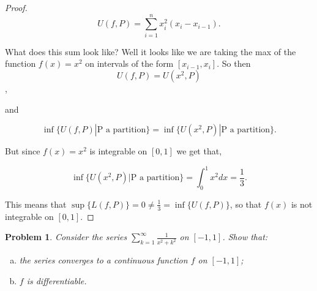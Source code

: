 \documentclass[11pt]{article}
\theoremstyle{plain}
\newtheorem{problem}{Problem}
\theoremstyle{remark}
\begin{document}
\begin{proof}
	\[
	U(f,P) =\sum_{i=1}^n x^2_i(x_i-x_{i-1}).
	\]
	
	What does this sum look like? Well it looks like we are taking the max of the function $f(x)=x^2$ on intervals of the form $[x_{i-1},x_i]$. So then \[U(f,P)=U(x^2,P)\],
	
	and 
	
	\[\inf\{U(f,P)|\text{P a partition}\}=\inf \{U(x^2,P)|\text{P a partition}\}.\] 
	
	But since $f(x)=x^2$ is integrable on $[0,1]$ we get that,
	
	\[\inf \{U(x^2,P)|\text{P a partition}\}=\int_0^1 x^2 dx=\frac 1 3.\]
	
	This means that $\sup\{L(f,P)\}=0\neq \frac 1 3 =  \inf\{U(f,P)\}$, so that $f(x)$ is not integrable on $[0,1]$.
\end{proof}

\begin{problem}
	Consider the series $\sum_{k=1}^\infty \frac{1}{x^2+k^2}$ on $[-1,1]$. Show that:
	\begin{enumerate}[(a)]
		\item the series converges to a continuous function $f$ on $[-1,1]$; 
		\item $f$ is differentiable. 
	\end{enumerate}
\end{problem}
\end{document}

